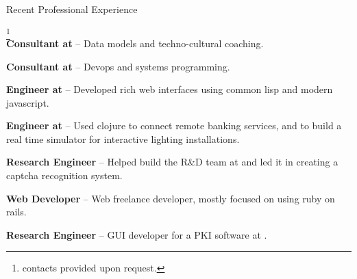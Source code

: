 \begin{rubric}{Recent Professional Experience}{ \footnote{contacts
      provided upon request.}  \\

    \entry*[2015-07 - present] \textbf{Consultant at
      } --
    Data models and techno-cultural coaching.

    \entry*[2015-05 - 2015-07] \textbf{Consultant at
      } --
    Devops and systems programming.

    \entry*[2013-06 - 2015-02] \textbf{Engineer at
      } --
    Developed rich web interfaces using common lisp and modern javascript.

    \entry*[2012 - 2013-06] \textbf{Engineer at
      } --
    Used clojure to connect remote banking services, and to build a real
    time simulator for interactive lighting installations.

    \entry*[2010 - 2012] \textbf{Research Engineer} -- Helped build
    the R\&D team at 
    and led it in creating a captcha recognition system.

    \entry*[2007-2009] \textbf{Web Developer} -- Web freelance
    developer, mostly focused on using ruby on rails.

    \entry*[2005 - 2007] \textbf{Research Engineer} -- GUI developer
    for a PKI software at .

  }
\end{rubric}
